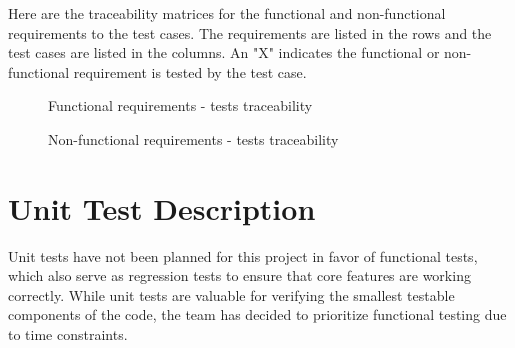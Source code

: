 \documentclass[12pt, titlepage]{article}
\begin{document}
Here are the traceability matrices for the functional and non-functional requirements to the test cases. The requirements are listed in the rows and the test cases are listed in the columns. An "X" indicates the functional or non-functional requirement is tested by the test case.

  \begin{figure}[h!]
    \caption{Functional requirements - tests traceability}
    \label{fig:fr}
  \end{figure} 
  
\begin{figure}[h!]
  \caption{Non-functional requirements - tests traceability}
  \label{fig:nfr}
\end{figure}
  
 

\section{Unit Test Description}
Unit tests have not been planned for this project in favor of functional tests, which also serve as regression tests to ensure that core features are working correctly. While unit tests are valuable for verifying the smallest testable components of the code, the team has decided to prioritize functional testing due to time constraints.




\end{document}
